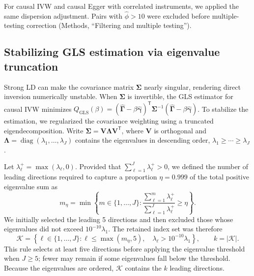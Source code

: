 \noindent For causal IVW and causal Egger with correlated instruments, we applied the same dispersion adjustment. Pairs with $\hat{\phi} > 10$ were excluded before multiple-testing correction (Methods, ``Filtering and multiple testing'').


\subsection*{Stabilizing GLS estimation via eigenvalue truncation}
\label{s1sec:gls}

\noindent Strong LD can make the covariance matrix $\boldsymbol{\Sigma}$ nearly singular, rendering direct inversion numerically unstable. When $\boldsymbol{\Sigma}$ is invertible, the GLS estimator for causal IVW minimizes $Q_{\text{GLS}}(\beta)=(\hat{\boldsymbol{\Gamma}}-\beta\hat{\boldsymbol{\gamma}})^{\mathsf T}\boldsymbol{\Sigma}^{-1}(\hat{\boldsymbol{\Gamma}}-\beta\hat{\boldsymbol{\gamma}})$. To stabilize the estimation, we regularized the covariance weighting using a truncated eigendecomposition. Write $\boldsymbol{\Sigma}=\boldsymbol V\boldsymbol{\Lambda}\boldsymbol V^{\mathsf T}$, where $\boldsymbol V$ is orthogonal and $\boldsymbol{\Lambda}=\operatorname{diag}(\lambda_1,\ldots,\lambda_J)$ contains the eigenvalues in descending order, $\lambda_1\geq\cdots\geq\lambda_J$.

\noindent Let $\lambda_\ell^{+}=\max(\lambda_\ell,0)$. Provided that $\sum_{\ell=1}^{J}\lambda_\ell^{+}>0$, we defined the number of leading directions required to capture a proportion $\eta=0.999$ of the total positive eigenvalue sum as
\begin{equation*}
m_{\eta}
=
\min\left\{
m\in\{1,\ldots,J\}:
\frac{\sum_{\ell=1}^{m}\lambda_\ell^{+}}
     {\sum_{\ell=1}^{J}\lambda_\ell^{+}}
\geq\eta
\right\}.
\end{equation*}
We initially selected the leading 5 directions and then excluded those whose eigenvalues did not exceed $10^{-10}\lambda_1$. The retained index set was therefore
\begin{equation*}
\mathcal K
=
\left\{
\ell\in\{1,\ldots,J\}:
\ell\leq\max(m_\eta,5),\quad
\lambda_\ell>10^{-10}\lambda_1
\right\},
\qquad
k=|\mathcal K|.
\end{equation*}
This rule selects at least five directions before applying the eigenvalue threshold when $J\geq5$; fewer may remain if some eigenvalues fall below the threshold. Because the eigenvalues are ordered, $\mathcal K$ contains the $k$ leading directions.

